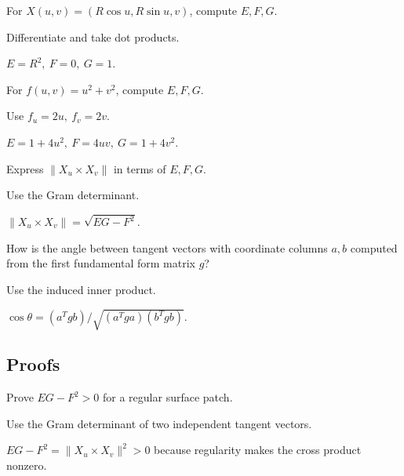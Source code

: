 \begin{exercise}\label{exr:vii15-ped-02}
For \(X(u,v)=(R\cos u,R\sin u,v)\), compute \(E,F,G\).
\end{exercise}
\begin{hint}
Differentiate and take dot products.
\end{hint}
\begin{solution}
\(E=R^2,\ F=0,\ G=1\).
\end{solution}

\begin{exercise}\label{exr:vii15-ped-03}
For \(f(u,v)=u^2+v^2\), compute \(E,F,G\).
\end{exercise}
\begin{hint}
Use \(f_u=2u,\ f_v=2v\).
\end{hint}
\begin{solution}
\(E=1+4u^2,\ F=4uv,\ G=1+4v^2\).
\end{solution}

\begin{exercise}\label{exr:vii15-ped-04}
Express \(\|X_u\times X_v\|\) in terms of \(E,F,G\).
\end{exercise}
\begin{hint}
Use the Gram determinant.
\end{hint}
\begin{solution}
\(\|X_u\times X_v\|=\sqrt{EG-F^2}\).
\end{solution}

\begin{exercise}\label{exr:vii15-ped-05}
How is the angle between tangent vectors with coordinate columns \(a,b\) computed from the first fundamental form matrix \(g\)?
\end{exercise}
\begin{hint}
Use the induced inner product.
\end{hint}
\begin{solution}
\(\cos\theta=(a^Tgb)/\sqrt{(a^Tga)(b^Tgb)}\).
\end{solution}

\subsection*{Proofs}

\begin{exercise}\label{exr:vii15-ped-06}
Prove \(EG-F^2>0\) for a regular surface patch.
\end{exercise}
\begin{hint}
Use the Gram determinant of two independent tangent vectors.
\end{hint}
\begin{solution}
\(EG-F^2=\|X_u\times X_v\|^2>0\) because regularity makes the cross product nonzero.
\end{solution}


